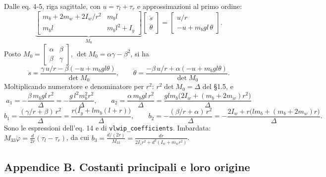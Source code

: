 \documentclass[
]{article}
\begin{document}
Dalle eq. 4-5, riga sagittale, con \(u = \tau_l+\tau_r\) e approssimazioni al primo ordine: \[\underbrace{\begin{bmatrix} m_b+2m_w+2I_w/r^2 & m_bl\\ m_bl & m_bl^2+I_y\end{bmatrix}}_{M_0}\begin{bmatrix}\ddot s\\ \ddot\theta\end{bmatrix} = \begin{bmatrix}u/r\\ -u + m_bgl\,\theta\end{bmatrix}.\] Posto \(M_0 = \begin{bmatrix}\alpha&\beta\\\beta&\gamma\end{bmatrix}\), \(\det M_0 = \alpha\gamma - \beta^2\), si ha \[\ddot s = \frac{\gamma\,u/r - \beta(-u+m_bgl\theta)}{\det M_0},\qquad \ddot\theta = \frac{-\beta\,u/r + \alpha(-u+m_bgl\theta)}{\det M_0}.\] Moltiplicando numeratore e denominatore per \(r^2\): \(r^2\det M_0 = \Delta\) del §1.5, e \[a_1 = -\frac{\beta\,m_bgl\,r^2}{\Delta} = -\frac{g\,l^2m_b^2r^2}{\Delta},\qquad a_2 = \frac{\alpha\,m_bgl\,r^2}{\Delta} = \frac{glm_b\big(2I_w + (m_b+2m_w)r^2\big)}{\Delta}\] \[b_1 = \frac{(\gamma/r+\beta)\,r^2}{\Delta} = \frac{r\big(I_y + lm_b(l+r)\big)}{\Delta},\qquad b_2 = -\frac{(\beta/r+\alpha)\,r^2}{\Delta} = -\frac{2I_w + r\big(lm_b+(m_b+2m_w)r\big)}{\Delta}.\] Sono le espressioni dell'eq. 14 e di \texttt{vlwip\_coefficients}. Imbardata: \(M_{33}\ddot\varphi = \frac{d}{2r}(\tau_l-\tau_r)\), da cui \(b_3 = \frac{d/(2r)}{M_{33}} = \frac{dr}{2I_zr^2 + d^2(I_w+m_wr^2)}\).

\subsection{Appendice B. Costanti principali e loro origine}\label{appendice-b-costanti-principali-e-loro-origine}
\end{document}
